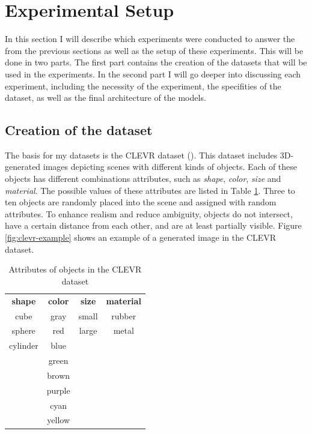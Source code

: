 \section{Experimental Setup}
\label{sec:exp-setup}


In this section I will describe which experiments were conducted to answer the  from the previous sections as well as the setup of these experiments.
This will be done in two parts.
The first part contains the creation of the datasets that will be used in the experiments.
In the second part I will go deeper into discussing each experiment, including the necessity of the experiment, the specifities of the dataset, as well as the final architecture of the models.

\subsection{Creation of the dataset}
The basis for my datasets is the CLEVR dataset (\cite{Johnson2016}).
This dataset includes 3D-generated images depicting scenes with different kinds of objects.
Each of these objects has different combinations attributes, such as \emph{shape}, \emph{color}, \emph{size} and \emph{material}.
The possible values of these attributes are listed in Table \ref{tab:clevr-attributes}.
Three to ten objects are randomly placed into the scene and assigned with random attributes.
To enhance realism and reduce ambiguity, objects do not intersect, have a certain distance from each other, and are at least partially visible.
Figure \ref{fig:clevr-example} shows an example of a generated image in the CLEVR dataset.

\begin{table}[h]
    \centering
    \begin{tabular}{cccc}
        \toprule
        \textbf{ shape } & \textbf{ color } & \textbf{ size } & \textbf{ material } \\
        cube             & gray             & small           & rubber              \\
        sphere           & red              & large           & metal               \\
        cylinder         & blue                                                     \\
                         & green                                                    \\
                         & brown                                                    \\
                         & purple                                                   \\
                         & cyan                                                     \\
                         & yellow                                                   \\
        \bottomrule
    \end{tabular}
    \caption{Attributes of objects in the CLEVR dataset}
    \label{tab:clevr-attributes}
\end{table}


